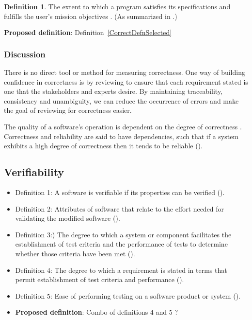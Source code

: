 \documentclass[letterpaper,cleveref]{lipics-v2019}
\theoremstyle{definition}
\newtheorem{defn}{Definition}
\begin{document}
\begin{defn}
  The extent to which a program satisfies its specifications and fulfills the
  user's mission objectives \citep{McCallEtAl1977}. (As summarized in
  \citet{VanVliet2000}.)
\end{defn}

\noindent \textbf{Proposed definition}: Definition~\ref{CorrectDefnSelected}
	
\subsubsection{Discussion}

There is no direct tool or method for measuring correctness. One way of building
confidence in correctness is by reviewing to ensure that each requirement stated
is one that the stakeholders and experts desire.  By maintaining traceability,
consistency and unambiguity, we can reduce the occurrence of errors and make the
goal of reviewing for correctness easier.

The quality of a software's operation is dependent on the degree of correctness
\cite{berander2005software}. Correctness and reliability are said to have
dependencies, such that if a system exhibits a high degree of correctness then
it tends to be reliable (\cite{GhezziEtAl2003}).

\subsection{Verifiability}
\begin{itemize}
\item{Definition 1:} A software is verifiable if its properties can be verified
  (\cite{GhezziEtAl2003}).
\item{Definition 2:} Attributes of software that relate to the effort needed for
  validating the modified software (\cite{berander2005software}).
\item{Definition 3:}) The degree to which a system or component facilitates the
  establishment of test criteria and the performance of tests to determine
  whether those criteria have been met (\cite{IEEEStdGlossarySET1990}).
\item{Definition 4:} The degree to which a requirement is stated in terms that
  permit establishment of test criteria and performance
  (\cite{IEEEStdGlossarySET1990}).
\item{Definition 5:} Ease of performing testing on a software product or system
  (\cite{IEEEStdGlossarySET1990}).
\item{\textbf{Proposed definition}:} Combo of definitions 4 and 5 ?
\end{itemize}
\end{document}

